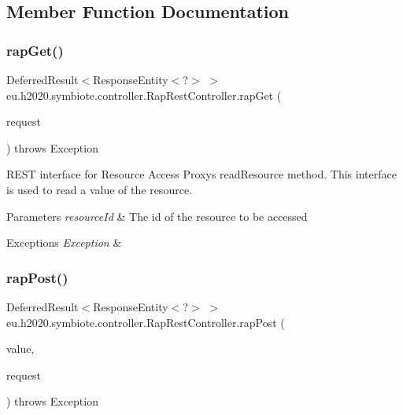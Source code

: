 \subsection{Member Function Documentation}
\mbox{\label{classeu_1_1h2020_1_1symbiote_1_1controller_1_1RapRestController_a505d4e7b0a63caeb4343679149422b26}} 
\subsubsection{\texorpdfstring{rap\+Get()}{rapGet()}}
{\footnotesize\ttfamily Deferred\+Result$<$Response\+Entity$<$?$>$ $>$ eu.\+h2020.\+symbiote.\+controller.\+Rap\+Rest\+Controller.\+rap\+Get (\begin{DoxyParamCaption}\item[{Http\+Servlet\+Request}]{request }\end{DoxyParamCaption}) throws Exception}

R\+E\+ST interface for Resource Access Proxy\textquotesingle{}s read\+Resource method. This interface is used to read a value of the resource.


\begin{DoxyParams}{Parameters}
{\em resource\+Id} & The id of the resource to be accessed \\
\hline
\end{DoxyParams}

\begin{DoxyExceptions}{Exceptions}
{\em Exception} & \\
\hline
\end{DoxyExceptions}
\mbox{\label{classeu_1_1h2020_1_1symbiote_1_1controller_1_1RapRestController_a6c012c973b8b6500acc7c638a53b45a1}} 
\subsubsection{\texorpdfstring{rap\+Post()}{rapPost()}}
{\footnotesize\ttfamily Deferred\+Result$<$Response\+Entity$<$?$>$ $>$ eu.\+h2020.\+symbiote.\+controller.\+Rap\+Rest\+Controller.\+rap\+Post (\begin{DoxyParamCaption}\item[{@Request\+Body String}]{value,  }\item[{Http\+Servlet\+Request}]{request }\end{DoxyParamCaption}) throws Exception}

